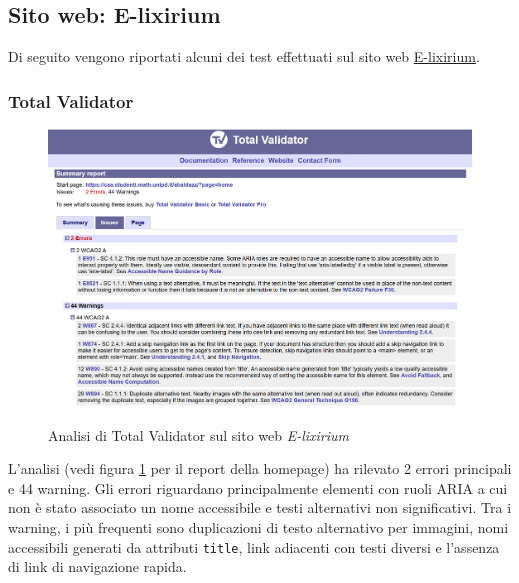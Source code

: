 \subsection{Sito web: E-lixirium}
\noindent Di seguito vengono riportati alcuni dei test effettuati sul sito web \href{https://caa.studenti.math.unipd.it/abaldazz/?page=home}{E-lixirium}.
\subsubsection{Total Validator}
\begin{figure}[H]
    \centering
    \includegraphics[width=0.8\linewidth, alt={Screenshot dell'analisi di Total Validator sul sito web E-lixirium}]{img/TV_elixirium.png}
    \caption{Analisi di Total Validator sul sito web \textit{E-lixirium}}\label{fig:TV_elixirium}
\end{figure}

\noindent L'analisi (vedi figura \ref{fig:TV_elixirium} per il report della homepage) ha rilevato 2 errori principali e 44 warning. 
Gli errori riguardano principalmente elementi con ruoli ARIA a cui non è stato associato un nome accessibile e testi alternativi non significativi. Tra i warning, i più frequenti sono duplicazioni di testo alternativo per immagini, nomi accessibili generati da attributi \texttt{title}, link adiacenti con testi diversi e l’assenza di link di navigazione rapida. 

